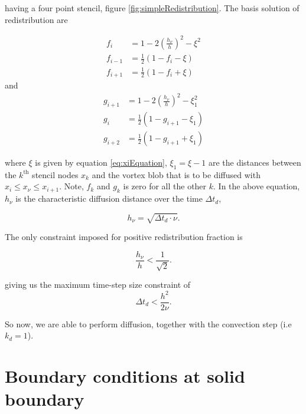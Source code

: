 having a four point stencil, figure \ref{fig:simpleRedistribution}. The basis solution of redistribution are 

	\begin{subequations}
	\begin{align}
	f_i &= 1 - 2\left(\frac{h_{\nu}}{h}\right)^2 - \xi^2\\
	f_{i-1} &= \frac{1}{2}\left(1-f_i-\xi\right)\\
	f_{i+1} &= \frac{1}{2}\left(1-f_i+\xi\right)
	\end{align}
	\end{subequations}
and 	
	\begin{subequations}
	\begin{align}
	g_{i+1} &= 1 - 2\left(\frac{h_{\nu}}{h}\right)^2 - \xi_1^2\\
	g_{i} &= \frac{1}{2}\left(1-g_{i+1}-\xi_1\right)\\
	g_{i+2} &= \frac{1}{2}\left(1-g_{i+1}+\xi_1\right)
	\end{align}
	\end{subequations}

where $\xi$ is given by equation \ref{eq:xiEquation}, $\xi_1 = \xi - 1$ are the distances between the $k^{\mathrm{th}}$ stencil nodes $x_k$ and the vortex blob that is to be diffused with $x_i \le x_{\nu} \le x_{i+1}$. Note, $f_k$ and $g_k$ is zero for all the other $k$. In the above equation, $h_{\nu}$ is the characteristic diffusion distance over the time $\Delta t_d$, 

	\begin{equation}
	h_{\nu} = \sqrt{\Delta t_d \cdot \nu}.
	\end{equation}
	
	
The only constraint imposed  for positive redistribution fraction is

	\begin{equation}
	\frac{h_{\nu}}{h} < \frac{1}{\sqrt{2}}.
	\end{equation}
	
giving us the maximum time-step size constraint of
	\begin{equation}
	\Delta t_d < \frac{h^2}{2\nu}.
	\end{equation}

So now, we are able to perform diffusion, together with the convection step (i.e $k_d = 1$).

\section{Boundary conditions at solid boundary}
\label{sec:boundaryConditions}

